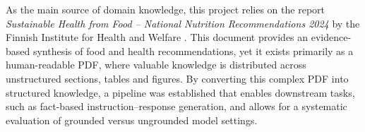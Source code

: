 As the main source of domain knowledge, this project relies on the report \textit{Sustainable Health from Food -- National Nutrition Recommendations 2024} by the Finnish Institute for Health and Welfare \cite{thl2024nutrition}. This document provides an evidence-based synthesis of food and health recommendations, yet it exists primarily as a human-readable PDF, where valuable knowledge is distributed across unstructured sections, tables and figures. By converting this complex PDF into structured knowledge, a pipeline was established that enables downstream tasks, such as fact-based instruction–response generation, and allows for a systematic evaluation of grounded versus ungrounded model settings.


